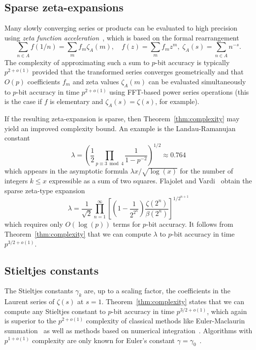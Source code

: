 \documentclass[reqno]{amsart}
\newcommand{\be}{\begin{equation}}
\newcommand{\ee}{\end{equation}}
\theoremstyle{definition}
\begin{document}
\subsection{Sparse zeta-expansions}

Many slowly converging series or products can
be evaluated to high precision using \emph{zeta function acceleration}~\cite{flajolet1996zeta},
which is based on the formal rearrangement
\be
\sum_{n \in A} f(1/n) = \sum_m f_m \zeta_A(m), \quad f(z) = \sum_m f_m z^m, \; \zeta_A(s) = \sum_{n \in A} n^{-s}.
\ee
The complexity of approximating such a sum to $p$-bit accuracy
is typically $p^{2+o(1)}$ provided that the transformed series
converges geometrically
and that $O(p)$ coefficients $f_m$ and zeta values $\zeta_A(m)$
can be evaluated simultaneously to $p$-bit accuracy in time $p^{2+o(1)}$ using
FFT-based power series operations (this is the case if $f$ is elementary
and $\zeta_A(s) = \zeta(s)$, for example).

If the resulting zeta-expansion is sparse, then Theorem~\ref{thm:complexity} may yield
an improved complexity bound. An example is the
Landau-Ramanujan constant
\be
\lambda = \left(\frac{1}{2} \prod_{p \equiv 3 \bmod 4} \frac{1}{1-p^{-2}} \right)^{1/2} \approx 0.764
\ee
which appears in the asymptotic formula $\lambda x / \sqrt{\log(x)}$ for the number of integers $k \le x$
expressible as a sum of two squares.
Flajolet and Vardi~\cite{flajolet1996zeta} obtain the sparse zeta-type expansion
\be
\lambda = \frac{1}{\sqrt{2}} \prod_{n=1}^{\infty} \left[ \left(1 - \frac{1}{2^{2^n}}\right) \frac{\zeta(2^n)}{\beta(2^n)} \right]^{1/2^{n+1}}
\ee
which requires only $O(\log(p))$ terms for $p$-bit accuracy.
It follows from Theorem~\ref{thm:complexity} that we can compute $\lambda$ to $p$-bit accuracy in time $p^{3/2+o(1)}$.


\subsection{Stieltjes constants}


The Stieltjes constants $\gamma_k$ are, up to a scaling factor,
the coefficients in the Laurent series of $\zeta(s)$ at $s = 1$.
Theorem~\ref{thm:complexity} states that we can compute any
Stieltjes constant to $p$-bit accuracy in time $p^{3/2+o(1)}$,
which again is superior to the $p^{2+o(1)}$ complexity
of classical methods like Euler-Maclaurin summation~\cite{liang1972stieltjes,Johansson2014hurwitz}
as well as methods based on numerical integration~\cite{JohanssonBlagouchine2018stieltjes}.
Algorithms with $p^{1+o(1)}$ complexity are only known
for Euler's constant $\gamma = \gamma_0$~\cite{BrentMcMillan1980}.
\end{document}
